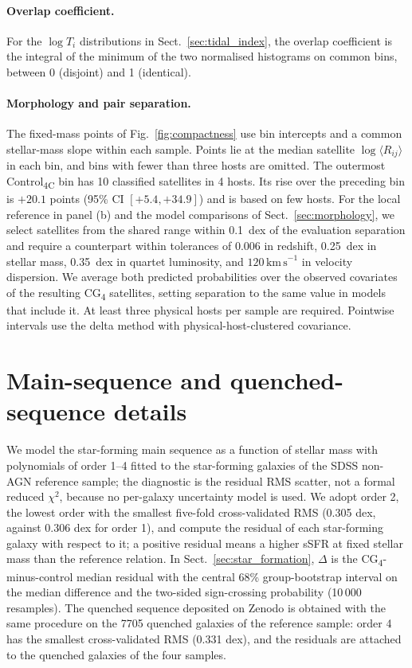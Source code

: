 \documentclass{aa}
\newcommand{\CC}{Control\textsubscript{4C}}
\newcommand{\CG}{CG\textsubscript{4}}
\newcommand{\kms}{\,\mathrm{km\,s}^{-1}}
\newcommand{\Rmed}{\langle R_{ij}\rangle}
\begin{document}
\begin{appendix}
\paragraph{Overlap coefficient.} For the \(\log T_i\) distributions in Sect.~\ref{sec:tidal_index}, the overlap coefficient is the integral of the minimum of the two normalised histograms on common bins, between 0 (disjoint) and 1 (identical).

\paragraph{Morphology and pair separation.} The fixed-mass points of Fig.~\ref{fig:compactness} use bin intercepts and a common stellar-mass slope within each sample. Points lie at the median satellite \(\log\Rmed\) in each bin, and bins with fewer than three hosts are omitted. The outermost \CC{} bin has 10 classified satellites in 4 hosts. Its rise over the preceding bin is \(+20.1\) points (95\% CI \([+5.4, +34.9]\)) and is based on few hosts. For the local reference in panel (b) and the model comparisons of Sect.~\ref{sec:morphology}, we select satellites from the shared range within 0.1~dex of the evaluation separation and require a counterpart within tolerances of 0.006 in redshift, 0.25~dex in stellar mass, 0.35~dex in quartet luminosity, and \(120\kms\) in velocity dispersion. We average both predicted probabilities over the observed covariates of the resulting \CG{} satellites, setting separation to the same value in models that include it. At least three physical hosts per sample are required. Pointwise intervals use the delta method with physical-host-clustered covariance.

\section{Main-sequence and quenched-sequence details}\label{app:baseline_details}

We model the star-forming main sequence as a function of stellar mass with polynomials of order 1--4 fitted to the star-forming galaxies of the SDSS non-AGN reference sample; the diagnostic is the residual RMS scatter, not a formal reduced \(\chi^2\), because no per-galaxy uncertainty model is used. We adopt order 2, the lowest order with the smallest five-fold cross-validated RMS (0.305 dex, against 0.306 dex for order 1), and compute the residual of each star-forming galaxy with respect to it; a positive residual means a higher sSFR at fixed stellar mass than the reference relation. In Sect.~\ref{sec:star_formation}, \(\Delta\) is the \CG{}-minus-control median residual with the central 68\% group-bootstrap interval on the median difference and the two-sided sign-crossing probability (10\,000 resamples). The quenched sequence deposited on Zenodo is obtained with the same procedure on the 7705 quenched galaxies of the reference sample: order 4 has the smallest cross-validated RMS (0.331 dex), and the residuals are attached to the quenched galaxies of the four samples.



\end{appendix}
\end{document}
